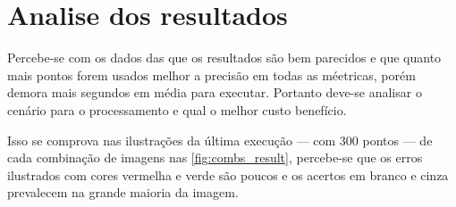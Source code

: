 \section{Analise dos resultados}

Percebe-se com os dados das  que os resultados são bem parecidos e que quanto mais pontos forem usados melhor a precisão em todas as méetricas, porém demora mais segundos em média para executar. Portanto deve-se analisar o cenário para o processamento e qual o melhor custo benefício.

Isso se comprova nas ilustrações da última execução — com 300 pontos — de cada combinação de imagens nas \cref{fig:combs_result}, percebe-se que os erros ilustrados com cores vermelha e verde são poucos e os acertos em branco e cinza prevalecem na grande maioria da imagem.
